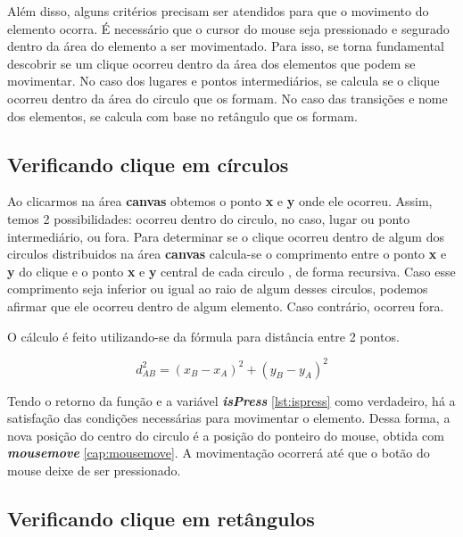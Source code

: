 \documentclass[
	12pt,				%
	openright,			%
	oneside,			%
	a4paper,			%
	english,			%
	brazil				%
	]{abntex2}
\begin{document}
Além disso, alguns critérios precisam ser atendidos para que o movimento do elemento ocorra. É necessário que o cursor do mouse seja pressionado e segurado dentro da área do elemento a ser movimentado. Para isso, se torna fundamental descobrir se um clique ocorreu dentro da área dos elementos que podem se movimentar. No caso dos lugares e pontos intermediários, se calcula se o clique ocorreu dentro da área do circulo que os formam. No caso das transições e nome dos elementos, se calcula com base no retângulo que os formam. 

\subsection*{Verificando clique em círculos}

Ao clicarmos na área \textbf{canvas} obtemos o ponto \textbf{x} e \textbf{y} onde ele ocorreu. Assim, temos 2 possibilidades: ocorreu dentro do circulo, no caso, lugar ou ponto intermediário, ou fora. Para determinar se o clique ocorreu dentro de algum dos circulos distribuidos na área \textbf{canvas} calcula-se o comprimento entre o ponto \textbf{x} e \textbf{y} do clique e o ponto \textbf{x} e \textbf{y} central de cada circulo \cite{Macoratti2014}, de forma recursiva. Caso esse comprimento seja inferior ou igual ao raio de algum desses circulos, podemos afirmar que ele ocorreu dentro de algum elemento. Caso contrário, ocorreu fora.

O cálculo é feito utilizando-se da fórmula para distância entre 2 pontos. 

\begin{equation}\label{eq:distancia_entre_pontos}
	d_{AB}^2 = (x_B - x_A)^2 + (y_B - y_A)^2
\end{equation}



Tendo o retorno da função e a variável \textbf{\textit{isPress}} \ref{lst:ispress} como verdadeiro, há a satisfação das condições necessárias para movimentar o elemento. Dessa forma, a nova posição do centro do circulo é a posição do ponteiro do mouse, obtida com \textbf{\textit{mousemove}} \ref{cap:mousemove}. A movimentação ocorrerá até que o botão do mouse deixe de ser pressionado. 

\subsection*{Verificando clique em retângulos}
\end{document}
